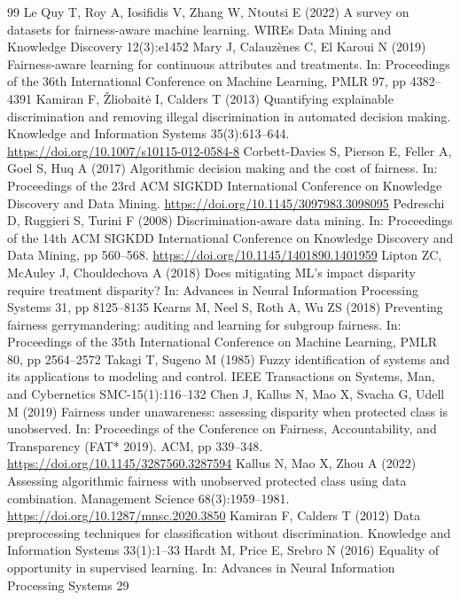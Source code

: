 \documentclass[pdflatex,sn-basic,Numbered,lineno]{sn-jnl}
\begin{document}
\begin{thebibliography}{99}
 Le Quy T, Roy A, Iosifidis V, Zhang W, Ntoutsi E (2022) A survey on datasets for fairness-aware machine learning. WIREs Data Mining and Knowledge Discovery 12(3):e1452
 Mary J, Calauzènes C, El Karoui N (2019) Fairness-aware learning for continuous attributes and treatments. In: Proceedings of the 36th International Conference on Machine Learning, PMLR 97, pp 4382–4391
 Kamiran F, Žliobait\.{e} I, Calders T (2013) Quantifying explainable discrimination and removing illegal discrimination in automated decision making. Knowledge and Information Systems 35(3):613–644. \url{https://doi.org/10.1007/s10115-012-0584-8}
 Corbett-Davies S, Pierson E, Feller A, Goel S, Huq A (2017) Algorithmic decision making and the cost of fairness. In: Proceedings of the 23rd ACM SIGKDD International Conference on Knowledge Discovery and Data Mining. \url{https://doi.org/10.1145/3097983.3098095}
 Pedreschi D, Ruggieri S, Turini F (2008) Discrimination-aware data mining. In: Proceedings of the 14th ACM SIGKDD International Conference on Knowledge Discovery and Data Mining, pp 560–568. \url{https://doi.org/10.1145/1401890.1401959}
 Lipton ZC, McAuley J, Chouldechova A (2018) Does mitigating ML's impact disparity require treatment disparity? In: Advances in Neural Information Processing Systems 31, pp 8125–8135
 Kearns M, Neel S, Roth A, Wu ZS (2018) Preventing fairness gerrymandering: auditing and learning for subgroup fairness. In: Proceedings of the 35th International Conference on Machine Learning, PMLR 80, pp 2564–2572
 Takagi T, Sugeno M (1985) Fuzzy identification of systems and its applications to modeling and control. IEEE Transactions on Systems, Man, and Cybernetics SMC-15(1):116–132
 Chen J, Kallus N, Mao X, Svacha G, Udell M (2019) Fairness under unawareness: assessing disparity when protected class is unobserved. In: Proceedings of the Conference on Fairness, Accountability, and Transparency (FAT* 2019). ACM, pp 339–348. \url{https://doi.org/10.1145/3287560.3287594}
 Kallus N, Mao X, Zhou A (2022) Assessing algorithmic fairness with unobserved protected class using data combination. Management Science 68(3):1959–1981. \url{https://doi.org/10.1287/mnsc.2020.3850}
 Kamiran F, Calders T (2012) Data preprocessing techniques for classification without discrimination. Knowledge and Information Systems 33(1):1–33
 Hardt M, Price E, Srebro N (2016) Equality of opportunity in supervised learning. In: Advances in Neural Information Processing Systems 29

\end{thebibliography}
\end{document}

